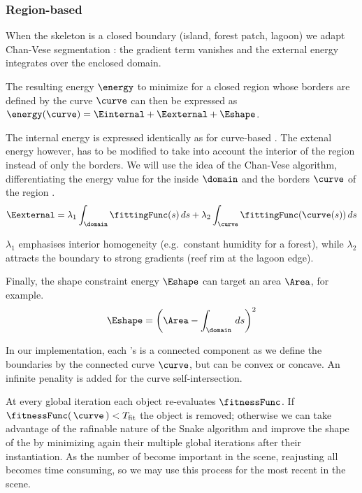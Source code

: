 \subsubsection{Region-based }

When the skeleton is a closed boundary (island, forest patch, lagoon) we adapt Chan-Vese segmentation \cite{Chan2001}: the gradient term vanishes and the external energy integrates over the enclosed domain.

The resulting energy $\energy$ to minimize for a closed region whose borders are defined by the curve $\curve$ can then be expressed as $\energy(\curve) = \Einternal + \Eexternal + \Eshape$.

The internal energy is expressed identically as for curve-based . The extenal energy however, has to be modified to take into account the interior of the region instead of only the borders. We will use the idea of the Chan-Vese algorithm, differentiating the energy value for the inside $\domain$ and the borders $\curve$ of the region \cite{Chan2001, Getreuer2012}.
\begin{align}
    \Eexternal = \lambda_1 \int_{\domain}{ \fittingFunc(s) \, ds } + \lambda_2 \int_{\curve}{ \fittingFunc(\curve(s)) \, ds }
\end{align}

$\lambda_1$ emphasises interior homogeneity (e.g.\ constant humidity for a forest), while $\lambda_2$ attracts the boundary to strong gradients (reef rim at the lagoon edge).%

Finally, the shape constraint energy $\Eshape$ can target an area $\Area$, for example.
\begin{align}
    \Eshape = \left( \Area - \int_{\domain}{ \, ds } \right)^2
\end{align}

In our implementation, each 's  is a connected component as we define the boundaries by the connected curve $\curve$, but can be convex or concave. An infinite penality is added for the curve self-intersection.

At every global iteration each object re-evaluates $\fitnessFunc$.  If $\fitnessFunc(\,\curve\,)<T_{\mathrm{fit}}$ the object is removed; otherwise we can take advantage of the rafinable nature of the Snake algorithm and improve the shape of the  by minimizing again their  multiple global iterations after their instantiation. As the number of  become important in the scene, reajusting all  becomes time consuming, so we may use this process for the most recent  in the scene.

